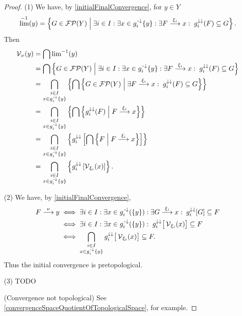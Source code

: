 \begin{proof}
(1) We have, by \ref{initialFinalConvergence}, for $y\in Y$
\[ \lim^{-1}(y) = \left\{ G\in\operatorname{\mathcal{FP}}(Y) \;\middle|\; \exists i\in I: \exists x\in g_i^{\text{\hspace{0.15em}-}\downarrow}\{y\}: \exists F\overset{\xi_i}{\longrightarrow}x:\; g_i^{\downarrow\downarrow}(F)\subseteq G \right\}. \]
Then
\begin{align*}
\operatorname{\mathcal{V}}_\nu(y) &= \bigcap {\lim}^{-1}(y) \\
&= \bigcap \left\{ G\in\operatorname{\mathcal{FP}}(Y) \;\middle|\; \exists i\in I: \exists x\in g_i^{\text{\hspace{0.15em}-}\downarrow}\{y\}: \exists F\overset{\xi_i}{\longrightarrow}x:\; g_i^{\downarrow\downarrow}(F)\subseteq G \right\} \\
&= \bigcap_{\substack{i\in I \\ x\in g^{\text{\hspace{0.15em}-}\downarrow}_i\{y\}}} \left\{ \bigcap\left\{ G\in\operatorname{\mathcal{FP}}(Y) \;\middle|\; \exists F\overset{\xi_i}{\longrightarrow}x:\; g_i^{\downarrow\downarrow}(F)\subseteq G \right\} \right\} \\
&= \bigcap_{\substack{i\in I \\ x\in g^{\text{\hspace{0.15em}-}\downarrow}_i\{y\}}} \left\{ \bigcap\left\{ g_i^{\downarrow\downarrow}(F) \;\middle|\; F\overset{\xi_i}{\longrightarrow}x \right\} \right\} \\
&= \bigcap_{\substack{i\in I \\ x\in g^{\text{\hspace{0.15em}-}\downarrow}_i\{y\}}} \left\{ g_i^{\downarrow\downarrow}\left[\bigcap\left\{ F \;\middle|\; F\overset{\xi_i}{\longrightarrow}x \right\}\right] \right\} \\
&= \bigcap_{\substack{i\in I \\ x\in g^{\text{\hspace{0.15em}-}\downarrow}_i\{y\}}} \left\{ g_i^{\downarrow\downarrow}\left[\operatorname{\mathcal{V}}_{\xi_i}(x)\right] \right\}.
\end{align*}

(2) We have, by \ref{initialFinalConvergence},
\begin{align*}
F \overset{\nu}{\longrightarrow} y &\iff \exists i\in I: \exists x\in g_i^{\text{\hspace{0.15em}-}\downarrow}(\{y\}):  \exists G \overset{\xi_i}{\longrightarrow} x: \; g_i^{\downarrow\downarrow}[G] \subseteq F \\
&\iff \exists i\in I: \exists x\in g_i^{\text{\hspace{0.15em}-}\downarrow}(\{y\}): \; g_i^{\downarrow\downarrow}\big[\operatorname{\mathcal{V}}_{\xi_i}(x)\big] \subseteq F \\
&\iff \bigcap_{\substack{i\in I \\ x\in g^{\text{\hspace{0.15em}-}\downarrow}_i\{y\}}}g_i^{\downarrow\downarrow}\big[\operatorname{\mathcal{V}}_{\xi_i}(x)\big] \subseteq F.
\end{align*}
Thus the initial convergence is pretopological.

(3) TODO

(Convergence not topological) See \ref{convergenceSpaceQuotientOfTopologicalSpace}, for example.
\end{proof}

